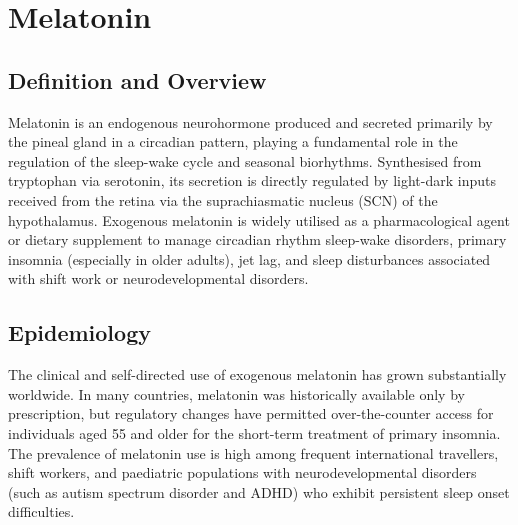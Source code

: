 \chapter{Melatonin}

\section*{Definition and Overview}
Melatonin is an endogenous neurohormone produced and secreted primarily by the pineal gland in a circadian pattern, playing a fundamental role in the regulation of the sleep-wake cycle and seasonal biorhythms. Synthesised from tryptophan via serotonin, its secretion is directly regulated by light-dark inputs received from the retina via the suprachiasmatic nucleus (SCN) of the hypothalamus. Exogenous melatonin is widely utilised as a pharmacological agent or dietary supplement to manage circadian rhythm sleep-wake disorders, primary insomnia (especially in older adults), jet lag, and sleep disturbances associated with shift work or neurodevelopmental disorders.

\section*{Epidemiology}
The clinical and self-directed use of exogenous melatonin has grown substantially worldwide. In many countries, melatonin was historically available only by prescription, but regulatory changes have permitted over-the-counter access for individuals aged 55 and older for the short-term treatment of primary insomnia. The prevalence of melatonin use is high among frequent international travellers, shift workers, and paediatric populations with neurodevelopmental disorders (such as autism spectrum disorder and ADHD) who exhibit persistent sleep onset difficulties.

